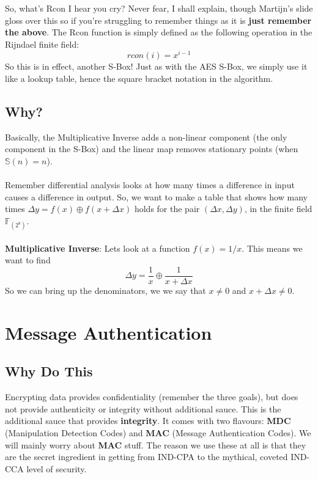     So, what's Rcon I hear you cry? Never fear, I shall explain, though Martijn's slide gloss over this so if you're struggling to remember things as it is \textbf{just remember the above}. The Rcon function is simply defined as the following operation in the Rijndael finite field:
    $$ rcon(i) = x^{i-1} $$
    So this is in effect, another S-Box! Just as with the AES S-Box, we simply use it like a lookup table, hence the square bracket notation in the algorithm.
    
        \subsection{Why?}
        Basically, the Multiplicative Inverse adds a non-linear component (the only component in the S-Box) and the linear map removes stationary points (when $\mathbb{S}(n)=n$).\\
        \\
        Remember differential analysis looks at how many times a difference in input causes a difference in output. So, we want to make a table that shows how many times $\Delta y = f(x) \oplus f(x+\Delta x)$ holds for the pair $(\Delta x, \Delta y)$, in the finite field $\mathbb{F}_{(2^8)}$.\\
        \\
        \textbf{Multiplicative Inverse}: Lets look at a function $f(x) = 1/x$. This means we want to find
        \begin{equation}
            \Delta y = \frac{1}{x} \oplus \frac{1}{x+\Delta x}
        \end{equation}
        So we can bring up the denominators, we we say that $x \neq 0$ and $x+\Delta x \neq 0$.


\section{Message Authentication}
    \subsection{Why Do This}
        Encrypting data provides confidentiality (remember the three goals), but does not provide authenticity or integrity without additional sauce. This is the additional sauce that provides \textbf{integrity}.
        It comes with two flavours: \textbf{MDC} (Manipulation Detection Codes) and \textbf{MAC} (Message Authentication Codes). We will mainly worry about \textbf{MAC} stuff.
        The reason we use these at all is that they are the secret ingredient in getting from IND-CPA to the mythical, coveted IND-CCA level of security.


